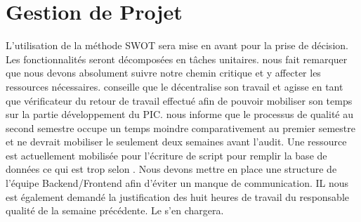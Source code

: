 \documentclass [a4paper] {article}
\begin{document}
\section{Gestion de Projet}
L'utilisation de la méthode SWOT sera mise en avant pour la prise de décision. Les fonctionnalités seront décomposées en tâches unitaires.
\nomTuteurPedago{} nous fait remarquer que nous devons absolument suivre notre chemin critique et y affecter les ressources nécessaires.
\nomTuteurPedago{} conseille que le \RQ{} décentralise son travail et agisse en tant que vérificateur du retour de travail effectué afin de pouvoir mobiliser son temps sur la partie développement du PIC.
\nomTuteurPedago{} nous informe que le processus de qualité au second semestre occupe un temps moindre comparativement au premier semestre et ne devrait mobiliser le \RQ{} seulement deux semaines avant l'audit. Une ressource est actuellement mobilisée pour l'écriture de script pour remplir la base de données ce qui est trop selon \nomTuteurPedago. Nous devons mettre en place une structure de l'équipe Backend/Frontend afin d'éviter un manque de communication.
IL nous est également demandé la justification des huit heures de travail du responsable qualité de la semaine précédente. Le \CP{} s'en chargera. 


\newpage
\end{document}
